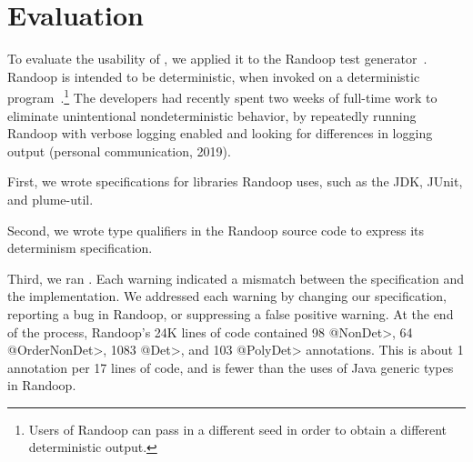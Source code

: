 \section{Evaluation\label{sec:results}}
To evaluate the usability of \theDeterminismChecker,
we applied it to the Randoop test
generator~\cite{PachecoLEB2007}.
Randoop is intended to be deterministic, when invoked on a deterministic
program~\cite{randoop-manual}.\footnote{Users of Randoop can pass in a different seed in order to
    obtain a different deterministic output.
}
The developers had recently
spent two weeks of full-time work to
eliminate unintentional nondeterministic behavior, by repeatedly
running Randoop with verbose logging enabled and
looking for differences in logging output (personal communication, 2019).

First, we wrote specifications for libraries Randoop uses, such as the JDK,
JUnit, and plume-util.

Second, we wrote type qualifiers in the Randoop source code to express its
determinism specification.

Third, we ran
\theDeterminismChecker.  Each warning indicated a mismatch between the
specification and the implementation.  We addressed each warning by changing our
specification, reporting a bug in Randoop, or suppressing a false positive warning.
At the end of the process, Randoop's 24K lines of code contained
98 \<@NonDet>,
64 \<@OrderNonDet>,
1083 \<@Det>,
and 103 \<@PolyDet> annotations.
This is about 1 annotation per 17 lines of code,
and is fewer than the uses
of Java generic types in Randoop.

